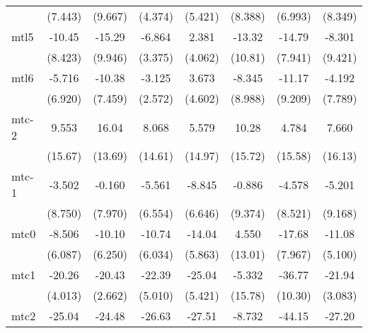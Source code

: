 \documentclass{article}
\begin{document}
{\begin{longtable}{l*{7}{c}}
                &  (7.443)         &  (9.667)         &  (4.374)         &  (5.421)         &  (8.388)         &  (6.993)         &  (8.349)         \\
mtl5            &   -10.45         &   -15.29         &   -6.864         &    2.381         &   -13.32         &   -14.79         &   -8.301         \\
                &  (8.423)         &  (9.946)         &  (3.375)         &  (4.062)         &  (10.81)         &  (7.941)         &  (9.421)         \\
mtl6            &   -5.716         &   -10.38         &   -3.125         &    3.673         &   -8.345         &   -11.17         &   -4.192         \\
                &  (6.920)         &  (7.459)         &  (2.572)         &  (4.602)         &  (8.988)         &  (9.209)         &  (7.789)         \\
mtc-2           &    9.553         &    16.04         &    8.068         &    5.579         &    10.28         &    4.784         &    7.660         \\
                &  (15.67)         &  (13.69)         &  (14.61)         &  (14.97)         &  (15.72)         &  (15.58)         &  (16.13)         \\
mtc-1           &   -3.502         &   -0.160         &   -5.561         &   -8.845         &   -0.886         &   -4.578         &   -5.201         \\
                &  (8.750)         &  (7.970)         &  (6.554)         &  (6.646)         &  (9.374)         &  (8.521)         &  (9.168)         \\
mtc0            &   -8.506         &   -10.10         &   -10.74         &   -14.04         &    4.550         &   -17.68         &   -11.08         \\
                &  (6.087)         &  (6.250)         &  (6.034)         &  (5.863)         &  (13.01)         &  (7.967)         &  (5.100)         \\
mtc1            &   -20.26\sym{**} &   -20.43\sym{***}&   -22.39\sym{**} &   -25.04\sym{**} &   -5.332         &   -36.77\sym{*}  &   -21.94\sym{***}\\
                &  (4.013)         &  (2.662)         &  (5.010)         &  (5.421)         &  (15.78)         &  (10.30)         &  (3.083)         \\
mtc2            &   -25.04\sym{*}  &   -24.48\sym{*}  &   -26.63\sym{*}  &   -27.51\sym{*}  &   -8.732         &   -44.15\sym{*}  &   -27.20\sym{*}  \\

\end{longtable}}
\end{document}
